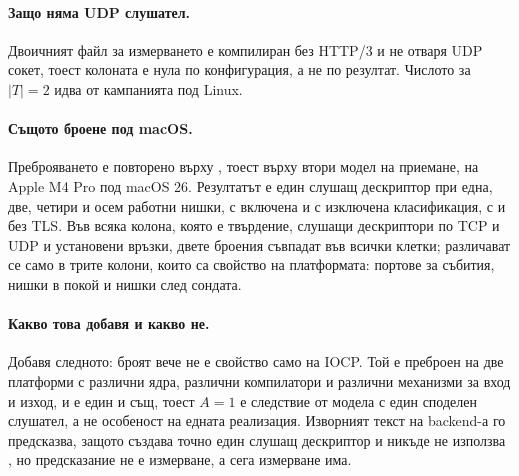 \paragraph{Защо няма UDP слушател.} Двоичният файл за измерването е компилиран без HTTP/3 и
не отваря UDP сокет, тоест колоната е нула по конфигурация, а не по резултат. Числото за
\(|T| = 2\) идва от кампанията под Linux.

\paragraph{Същото броене под macOS.} Преброяването е повторено върху , тоест
върху втори модел на приемане, на Apple M4 Pro под macOS 26. Резултатът е един слушащ
дескриптор при една, две, четири и осем работни нишки, с включена и с изключена
класификация, с и без TLS. Във всяка колона, която е твърдение, слушащи дескриптори по TCP и
UDP и установени връзки, двете броения съвпадат във всички клетки; различават се само в
трите колони, които са свойство на платформата: портове за събития, нишки в покой и нишки
след сондата.


\paragraph{Какво това добавя и какво не.} Добавя следното: броят вече не е свойство само на
IOCP. Той е преброен на две платформи с различни ядра, различни компилатори и различни
механизми за вход и изход, и е един и същ, тоест \(A = 1\) е следствие от модела с един
споделен слушател, а не особеност на едната реализация. Изворният текст на 
backend-а го предсказва, защото създава точно един слушащ дескриптор и никъде не използва
, но предсказание не е измерване, а сега измерване има.

